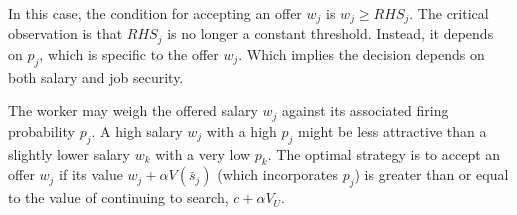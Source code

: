 \documentclass[11pt, a4paper, oneside]{memoir}
\begin{document}
In this case, the condition for accepting an offer $w_j$ is $w_j \ge RHS_j$.
The critical observation is that $RHS_j$ is no longer a constant threshold.
Instead, it depends on $p_j$, which is specific to the offer $w_j$. Which implies the decision depends on both salary and job security.

The worker may weigh the offered salary $w_j$ against its associated firing probability $p_j$.
A high salary $w_j$ with a high $p_j$ might be less attractive than a slightly lower salary $w_k$ with a very low $p_k$.
The optimal strategy is to accept an offer $w_j$
if its value $w_j + \alpha V(\bar{s}_j)$ (which incorporates $p_j$) is greater than or equal to the value of continuing to search, $c + \alpha V_U$.
\label{LastPage}
\end{document}

